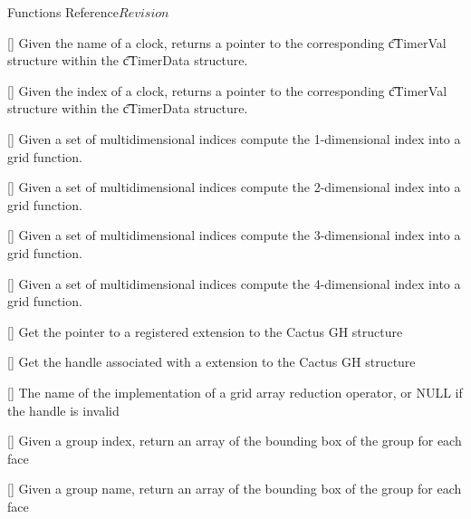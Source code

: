 \begin{cactuspart}{ Functions Reference}{}{$Revision$}
\begin{Lentry}
\item[\code{CCTK\_GetClockValue}] [\pageref{CCTK-GetClockValue}]
  Given the name of a clock, returns a pointer to the corresponding
  {\t cTimerVal} structure within the {\t cTimerData} structure.

\item[\code{CCTK\_GetClockValueI}] [\pageref{CCTK-GetClockValueI}]
  Given the index of a clock, returns a pointer to the corresponding
  {\t cTimerVal} structure within the {\t cTimerData} structure.

\item[\code{CCTK\_GFINDEX1D}] [\pageref{CCTK-GFINDEX1D}]
  Given a set of multidimensional indices compute the 1-dimensional index into
  a grid function.

\item[\code{CCTK\_GFINDEX2D}] [\pageref{CCTK-GFINDEX2D}]
  Given a set of multidimensional indices compute the 2-dimensional index into
  a grid function.

\item[\code{CCTK\_GFINDEX3D}] [\pageref{CCTK-GFINDEX3D}]
  Given a set of multidimensional indices compute the 3-dimensional index into
  a grid function.

\item[\code{CCTK\_GFINDEX4D}] [\pageref{CCTK-GFINDEX4D}]
  Given a set of multidimensional indices compute the 4-dimensional index into
  a grid function.

\item[\code{CCTK\_GHExtension}] [\pageref{CCTK-GHExtension}]
  Get the pointer to a registered extension to the Cactus GH structure

\item[\code{CCTK\_GHExtensionHandle}] [\pageref{CCTK-GHExtensionHandle}]
  Get the handle associated with a extension to the Cactus GH structure

\item[\code{CCTK\_GridArrayReductionOperator}] [\pageref{CCTK-GridArrayReductionOperator}]
     The name of the implementation of a grid array reduction operator, or NULL if the handle is invalid

\item[\code{CCTK\_GroupbboxGI}] [\pageref{CCTK-GroupbboxGI}]
  Given a group index, return an array of the bounding box
  of the group for each face

\item[\code{CCTK\_GroupbboxGN}] [\pageref{CCTK-GroupbboxGN}]
  Given a group name, return an array of the bounding box
  of the group for each face


\end{Lentry}
\end{cactuspart}
